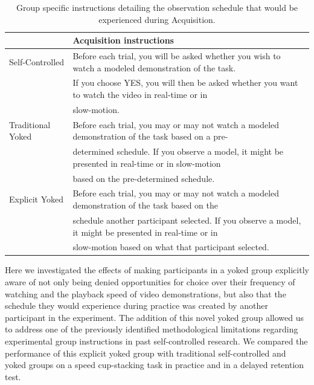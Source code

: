 \documentclass[
  english,
  jou]{apa7}
\begin{document}
\begin{table}[tbp]

\begin{center}
\begin{threeparttable}

\caption{\label{tab:table1}Group specific instructions detailing the observation schedule that would be experienced during Acquisition.}

\begin{tabular}{ll}
\toprule
  & Acquisition instructions\\
\midrule
Self-Controlled & Before each trial, you will be asked whether you wish to watch a modeled demonstration of the task.\\
 & If you choose YES, you will then be asked whether you want to watch the video in real-time or in\\
 & slow-motion.\\
Traditional Yoked & Before each trial, you may or may not watch a modeled demonstration of the task based on a pre-\\
 & determined schedule. If you observe a model, it might be presented in real-time or in slow-motion\\
 & based on the pre-determined schedule.\\
Explicit Yoked & Before each trial, you may or may not watch a modeled demonstration of the task based on the\\
 & schedule another participant selected. If you observe a model, it might be presented in real-time or in\\
 & slow-motion based on what that participant selected.\\
\bottomrule
\end{tabular}

\end{threeparttable}
\end{center}

\end{table}

Here we investigated the effects of making participants in a yoked group explicitly aware of not only being denied opportunities for choice over their frequency of watching and the playback speed of video demonstrations, but also that the schedule they would experience during practice was created by another participant in the experiment. The addition of this novel yoked group allowed us to address one of the previously identified methodological limitations regarding experimental group instructions in past self-controlled research. We compared the performance of this explicit yoked group with traditional self-controlled and yoked groups on a speed cup-stacking task in practice and in a delayed retention test.
\end{document}
